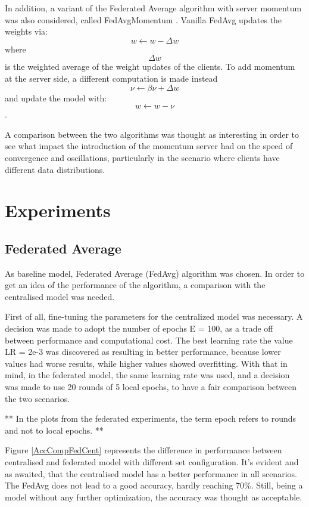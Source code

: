 \documentclass[twocolumn]{article}
\begin{document}
In addition, a variant of the Federated Average algorithm with server momentum was also considered, called FedAvgMomentum \cite{DBLP:journals/corr/abs-1909-06335}. Vanilla FedAvg updates the weights via: \[ w \leftarrow w - \Delta  w\] where \[\Delta  w  \] is the weighted average of the weight updates of the clients. To add momentum at the server side, a different computation is made instead \[ \nu \leftarrow  \beta\nu + \Delta w  \] and update the model with: \[w \leftarrow w - \nu \] . 

A comparison between the two algorithms was thought as interesting in order to see what impact the introduction of the momentum server had on the speed of convergence and oscillations, particularly in the scenario where clients have different data distributions.


\section{Experiments} %
\subsection{Federated Average}
As baseline model, Federated Average (FedAvg) algorithm was chosen. In order to get an idea of the performance of the algorithm, a comparison with the centralised model was needed. 

First of all, fine-tuning the parameters for the centralized model was necessary. A decision was made to adopt the number of epochs E = 100, as a trade off between performance and computational cost. The best learning rate the value LR = 2e-3 was discovered as resulting in better performance, because lower values had worse results, while higher values showed overfitting. With that in mind, in the federated model, the same learning rate was used, and a decision was made to use 20 rounds of 5 local epochs, to have a fair comparison between the two scenarios.

** In the plots from the federated experiments, the term epoch refers to rounds and not to local epochs. **

Figure \ref{AccCompFedCent} represents the difference in performance between centralised and federated model with different set configuration. It's evident and as awaited, that the centralised model has a better performance in all scenarios. The FedAvg does not lead to a good accuracy, hardly reaching 70\%. Still, being a model without any further optimization, the accuracy was thought as acceptable.
\end{document}
